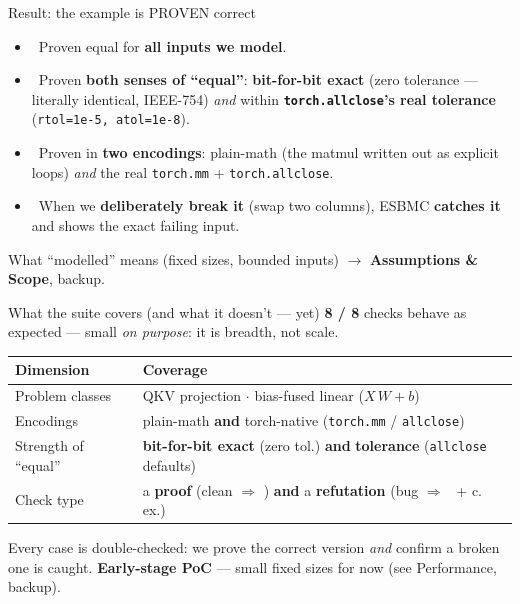 \documentclass[aspectratio=169,11pt]{beamer}
\newcommand{\good}{\textcolor{ok}{\ding{51}}}
\newcommand{\bad}{\textcolor{warn}{\ding{55}}}
\begin{document}
\begin{frame}{Result: the example is PROVEN correct}
  \begin{itemize}
    \item \good\ Proven equal for \textbf{all inputs we model}.
    \item \good\ Proven \textbf{both senses of ``equal''}: \textbf{bit-for-bit exact} (zero
      tolerance --- literally identical, IEEE-754) \emph{and} within
      \textbf{\texttt{torch.allclose}'s real tolerance} (\texttt{rtol=1e-5, atol=1e-8}).
    \item \good\ Proven in \textbf{two encodings}: plain-math (the matmul written out as
      explicit loops) \emph{and} the real \texttt{torch.mm} {+} \texttt{torch.allclose}.
    \item \good\ When we \textbf{deliberately break it} (swap two columns), ESBMC
      \textbf{catches it} and shows the exact failing input.
  \end{itemize}

  \bigskip
  {\footnotesize What ``modelled'' means (fixed sizes, bounded inputs) $\rightarrow$ \textbf{Assumptions \& Scope}, backup.}
\end{frame}

\begin{frame}{What the suite covers (and what it doesn't --- yet)}
  \textbf{8 / 8} checks behave as expected --- small \emph{on purpose}: it is breadth, not scale.

  \medskip
  \begin{tabular}{@{}ll@{}}
    \toprule
    \textbf{Dimension} & \textbf{Coverage} \\
    \midrule
    Problem classes & QKV projection $\cdot$ bias-fused linear ($X\,W + b$) \\
    Encodings & plain-math \textbf{and} torch-native (\texttt{torch.mm} / \texttt{allclose}) \\
    Strength of ``equal'' & \textbf{bit-for-bit exact} (zero tol.) \textbf{and} \textbf{tolerance} (\texttt{allclose} defaults) \\
    Check type & a \textbf{proof} (clean $\Rightarrow$ \good) \textbf{and} a \textbf{refutation} (bug $\Rightarrow$ \bad\ {+} c.\,ex.) \\
    \bottomrule
  \end{tabular}

  \medskip
  {\footnotesize Every case is double-checked: we prove the correct version \emph{and} confirm a broken one is
  caught. \textbf{Early-stage PoC} --- small fixed sizes for now (see Performance, backup).}
\end{frame}
\end{document}
